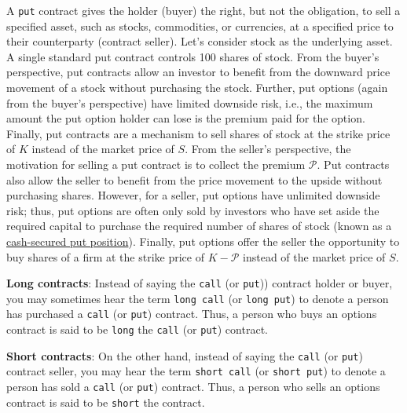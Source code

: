 \documentclass[11pt]{article}
\theoremstyle{definition}
\begin{document}
A \texttt{put} contract gives the holder (buyer) the right, but not the obligation, to sell a specified asset, 
such as stocks, commodities, or currencies, at a specified price to their counterparty (contract seller). 
Let's consider stock as the underlying asset. A single standard put contract controls 100 shares of stock.
From the buyer's perspective, put contracts allow an investor to benefit from the downward price movement of a stock without purchasing the stock. 
Further, put options (again from the buyer's perspective) have limited downside risk, i.e., the maximum amount the put option holder can lose is the premium paid for the option. 
Finally, put contracts are a mechanism to sell shares of stock at the strike price of $K$ instead of the market price of $S$. 
From the seller's perspective, the motivation for selling a put contract is to collect the premium $\mathcal{P}$. 
Put contracts also allow the seller to benefit from the price movement to the upside without purchasing shares.
However, for a seller, put options have unlimited downside risk; 
thus, put options are often only sold by investors who have set aside the required capital to purchase the required number of shares of stock 
(known as a \href{https://www.fidelity.com/learning-center/investment-products/options/know-about-cash-covered-puts}{cash-secured put position}).
Finally, put options offer the seller the opportunity to buy shares of a firm at the strike price of $K-\mathcal{P}$ instead of the market price of $S$.

\begin{concept}\label{concept:long-short-contracts}

	\textbf{Long contracts}: Instead of saying the \texttt{call} (or \texttt{put})) contract holder or buyer, you may sometimes hear the term \texttt{long call} (or \texttt{long put}) to denote a person has purchased a \texttt{call} (or \texttt{put}) contract.
	Thus, a person who buys an options contract is said to be \texttt{long} the \texttt{call} (or \texttt{put}) contract.
	
	\vspace{0.01in}
	\noindent\textbf{Short contracts}: On the other hand, instead of saying the \texttt{call} (or \texttt{put}) contract seller, you may hear the term \texttt{short call} (or \texttt{short put}) to denote a person has sold a \texttt{call} (or \texttt{put}) contract.
	Thus, a person who sells an options contract is said to be \texttt{short} the contract.
\end{concept}
\end{document}
